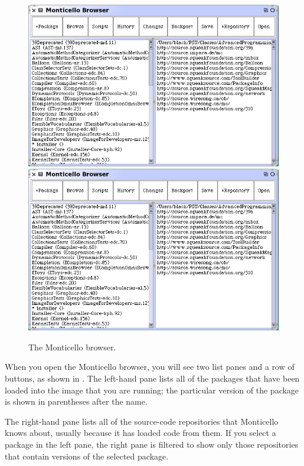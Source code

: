 \documentclass[a4paper,10pt,twoside]{book}
\begin{document}
\begin{figure}[btp]
	\begin{center}
	\ifluluelse
		{\includegraphics[width=\textwidth]{freshMonticello}}
		{\includegraphics[scale=0.7]{freshMonticello}}
	\end{center}
	\caption{The Monticello browser.}
	\label{fig:freshMonticello}
\end{figure}

When you open the Monticello browser, you will see two list panes and a row of buttons, as shown in .
The left-hand pane lists all of the packages that have been loaded into the image that you are running; the particular version of the package is shown in parentheses after the name.

The right-hand pane lists all of the source-code repositories that Monticello knows about, usually because it has loaded code from them.  If you select a package in the left pane, the right pane is filtered to show only those repositories that contain versions of the selected package.
\end{document}
